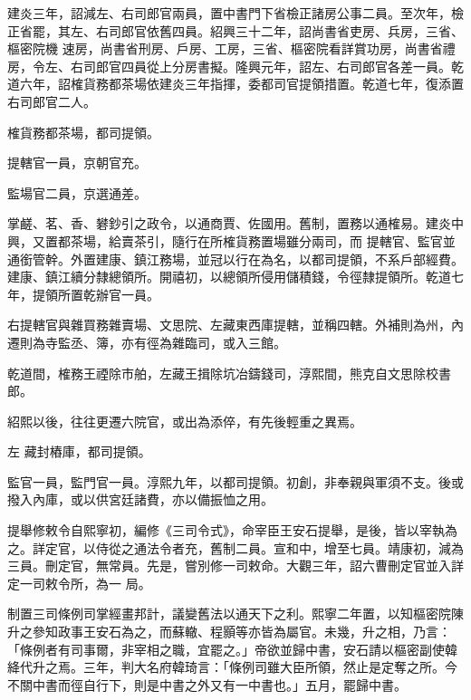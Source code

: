 \begin{pinyinscope}
 建炎三年，詔減左、右司郎官兩員，置中書門下省檢正諸房公事二員。至次年，檢正省罷，其左、右司郎官依舊四員。紹興三十二年，詔尚書省吏房、兵房，三省、樞密院機
 速房，尚書省刑房、戶房、工房，三省、樞密院看詳賞功房，尚書省禮房，令左、右司郎官四員從上分房書擬。隆興元年，詔左、右司郎官各差一員。乾道六年，詔榷貨務都茶場依建炎三年指揮，委都司官提領措置。乾道七年，復添置右司郎官二人。



 榷貨務都茶場，都司提領。



 提轄官一員，京朝官充。



 監場官二員，京選通差。



 掌鹺、茗、香、礬鈔引之政令，以通商賈、佐國用。舊制，置務以通榷易。建炎中興，又置都茶場，給賣茶引，隨行在所榷貨務置場雖分兩司，而
 提轄官、監官並通銜管幹。外置建康、鎮江務場，並冠以行在為名，以都司提領，不系戶部經費。建康、鎮江續分隸總領所。開禧初，以總領所侵用儲積錢，令徑隸提領所。乾道七年，提領所置乾辦官一員。



 右提轄官與雜買務雜賣場、文思院、左藏東西庫提轄，並稱四轄。外補則為州，內遷則為寺監丞、簿，亦有徑為雜臨司，或入三館。



 乾道間，榷務王禋除市舶，左藏王揖除坑冶鑄錢司，淳熙間，熊克自文思除校書郎。



 紹熙以後，往往更遷六院官，或出為添倅，有先後輕重之異焉。



 左
 藏封樁庫，都司提領。



 監官一員，監門官一員。淳熙九年，以都司提領。初創，非奉親與軍須不支。後或撥入內庫，或以供宮廷諸費，亦以備振恤之用。



 提舉修敕令自熙寧初，編修《三司令式》，命宰臣王安石提舉，是後，皆以宰執為之。詳定官，以侍從之通法令者充，舊制二員。宣和中，增至七員。靖康初，減為三員。刪定官，無常員。先是，嘗別修一司敕命。大觀三年，詔六曹刪定官並入詳定一司敕令所，為一
 局。



 制置三司條例司掌經畫邦計，議變舊法以通天下之利。熙寧二年置，以知樞密院陳升之參知政事王安石為之，而蘇轍、程顥等亦皆為屬官。未幾，升之相，乃言：「條例者有司事爾，非宰相之職，宜罷之。」帝欲並歸中書，安石請以樞密副使韓絳代升之焉。三年，判大名府韓琦言：「條例司雖大臣所領，然止是定奪之所。今不關中書而徑自行下，則是中書之外又有一中書也。」五月，罷歸中書。




\end{pinyinscope}
